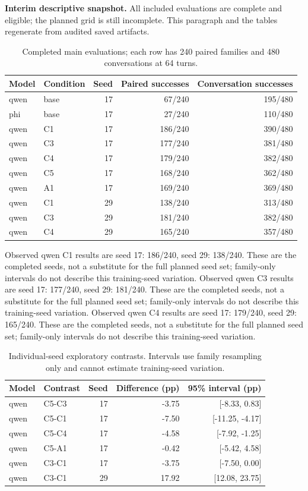 \textbf{Interim descriptive snapshot.} All included evaluations are complete and eligible; the planned grid is still incomplete. This paragraph and the tables regenerate from audited saved artifacts.
\begin{table}[ht]\centering\caption{Completed main evaluations; each row has 240 paired families and 480 conversations at 64 turns.}\begin{tabular}{llrrr}\toprule Model & Condition & Seed & Paired successes & Conversation successes\\\midrule
qwen & base & 17 & 67/240 & 195/480\\
phi & base & 17 & 27/240 & 110/480\\
qwen & C1 & 17 & 186/240 & 390/480\\
qwen & C3 & 17 & 177/240 & 381/480\\
qwen & C4 & 17 & 179/240 & 382/480\\
qwen & C5 & 17 & 168/240 & 362/480\\
qwen & A1 & 17 & 169/240 & 369/480\\
qwen & C1 & 29 & 138/240 & 313/480\\
qwen & C3 & 29 & 181/240 & 382/480\\
qwen & C4 & 29 & 165/240 & 357/480\\
\bottomrule\end{tabular}\end{table}
Observed qwen C1 results are seed 17: 186/240, seed 29: 138/240. These are the completed seeds, not a substitute for the full planned seed set; family-only intervals do not describe this training-seed variation.
Observed qwen C3 results are seed 17: 177/240, seed 29: 181/240. These are the completed seeds, not a substitute for the full planned seed set; family-only intervals do not describe this training-seed variation.
Observed qwen C4 results are seed 17: 179/240, seed 29: 165/240. These are the completed seeds, not a substitute for the full planned seed set; family-only intervals do not describe this training-seed variation.
\begin{table}[ht]\centering\caption{Individual-seed exploratory contrasts. Intervals use family resampling only and cannot estimate training-seed variation.}\begin{tabular}{llrrr}\toprule Model & Contrast & Seed & Difference (pp) & 95\% interval (pp)\\\midrule
qwen & C5-C3 & 17 & -3.75 & [-8.33, 0.83]\\
qwen & C5-C1 & 17 & -7.50 & [-11.25, -4.17]\\
qwen & C5-C4 & 17 & -4.58 & [-7.92, -1.25]\\
qwen & C5-A1 & 17 & -0.42 & [-5.42, 4.58]\\
qwen & C3-C1 & 17 & -3.75 & [-7.50, 0.00]\\
qwen & C3-C1 & 29 & 17.92 & [12.08, 23.75]\\
\bottomrule\end{tabular}\end{table}
